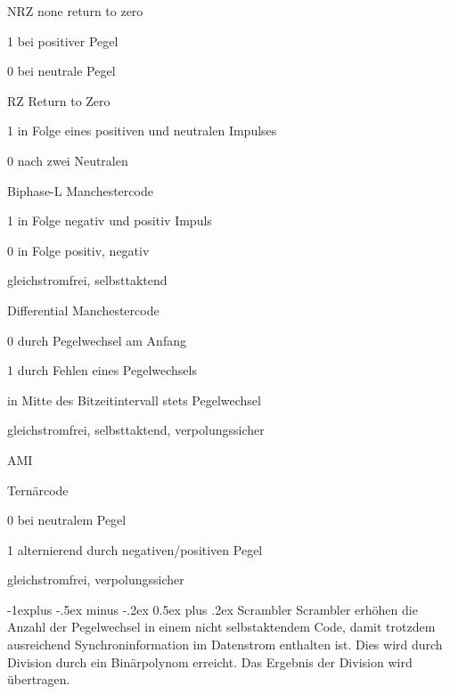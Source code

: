 \documentclass[10pt,landscape]{article}
\makeatletter
\renewcommand{\subsection}{\@startsection{subsection}{2}{0mm}%
                                {-1explus -.5ex minus -.2ex}%
                                {0.5ex plus .2ex}%
                                {\normalfont\normalsize\bfseries}}
\makeatother
\begin{document}
\begin{multicols}{3}
    \begin{description*}
        \item[NRZ] none return to zero
        \begin{itemize*}
            \item 1 bei positiver Pegel 
            \item 0 bei neutrale Pegel
        \end{itemize*}
        \item[RZ] Return to Zero
        \begin{itemize*} 
            \item 1 in Folge eines positiven und neutralen Impulses 
            \item 0 nach zwei Neutralen 
        \end{itemize*}
        \item[Biphase-L] Manchestercode
        \begin{itemize*} 
            \item 1 in Folge negativ und positiv Impuls 
            \item 0 in Folge positiv, negativ 
            \item gleichstromfrei, selbsttaktend
        \end{itemize*}
        \item[Differential] Manchestercode
        \begin{itemize*} 
            \item 0 durch Pegelwechsel am Anfang 
            \item 1 durch Fehlen eines Pegelwechsels 
            \item in Mitte des Bitzeitintervall stets Pegelwechsel 
            \item gleichstromfrei, selbsttaktend, verpolungssicher
        \end{itemize*}
        \item[AMI]
        \begin{itemize*} 
            \item Ternärcode 
            \item 0 bei neutralem Pegel 
            \item 1 alternierend durch negativen/positiven Pegel 
            \item gleichstromfrei, verpolungssicher
        \end{itemize*}
    \end{description*}
    
    \subsection{Scrambler}
    Scrambler erhöhen die Anzahl der Pegelwechsel in einem nicht selbstaktendem Code, damit trotzdem ausreichend Synchroninformation im Datenstrom enthalten ist. Dies wird durch Division durch ein Binärpolynom erreicht. Das Ergebnis der Division wird übertragen.
    

\end{multicols}
\end{document}
